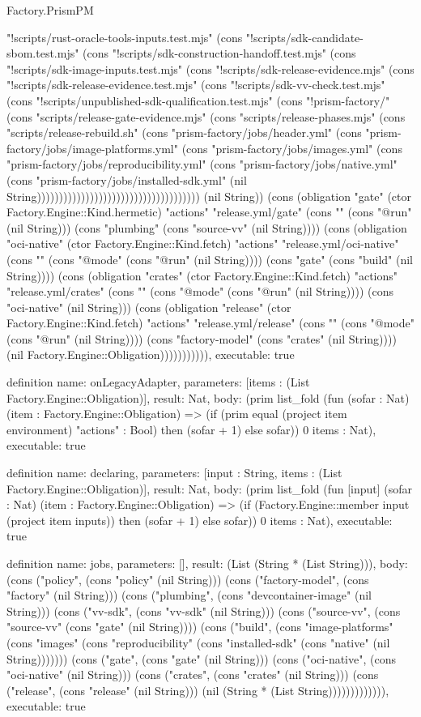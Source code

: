 \begin{lexlean}{Factory.PrismPM}
\begin{semanticmodule}
{"!scripts/rust-oracle-tools-inputs.test.mjs" (cons "!scripts/sdk-candidate-sbom.test.mjs" (cons "!scripts/sdk-construction-handoff.test.mjs" (cons "!scripts/sdk-image-inputs.test.mjs" (cons "!scripts/sdk-release-evidence.mjs" (cons "!scripts/sdk-release-evidence.test.mjs" (cons "!scripts/sdk-vv-check.test.mjs" (cons "!scripts/unpublished-sdk-qualification.test.mjs" (cons "!prism-factory/" (cons "scripts/release-gate-evidence.mjs" (cons "scripts/release-phases.mjs" (cons "scripts/release-rebuild.sh" (cons "prism-factory/jobs/header.yml" (cons "prism-factory/jobs/image-platforms.yml" (cons "prism-factory/jobs/images.yml" (cons "prism-factory/jobs/reproducibility.yml" (cons "prism-factory/jobs/native.yml" (cons "prism-factory/jobs/installed-sdk.yml" (nil String))))))))))))))))))))))))))))))))))))) (nil String)) (cons (obligation "gate" (ctor Factory.Engine::Kind.hermetic) "actions" "release.yml/gate" (cons "" (cons "@run" (nil String))) (cons "plumbing" (cons "source-vv" (nil String)))) (cons (obligation "oci-native" (ctor Factory.Engine::Kind.fetch) "actions" "release.yml/oci-native" (cons "" (cons "@mode" (cons "@run" (nil String)))) (cons "gate" (cons "build" (nil String)))) (cons (obligation "crates" (ctor Factory.Engine::Kind.fetch) "actions" "release.yml/crates" (cons "" (cons "@mode" (cons "@run" (nil String)))) (cons "oci-native" (nil String))) (cons (obligation "release" (ctor Factory.Engine::Kind.fetch) "actions" "release.yml/release" (cons "" (cons "@mode" (cons "@run" (nil String)))) (cons "factory-model" (cons "crates" (nil String)))) (nil Factory.Engine::Obligation))))))))))),
  executable: true
}

definition{
  name: onLegacyAdapter,
  parameters: [items : (List Factory.Engine::Obligation)],
  result: Nat,
  body: (prim list_fold (fun (sofar : Nat) (item : Factory.Engine::Obligation) => (if (prim equal (project item environment) "actions" : Bool) then (sofar + 1) else sofar)) 0 items : Nat),
  executable: true
}

definition{
  name: declaring,
  parameters: [input : String, items : (List Factory.Engine::Obligation)],
  result: Nat,
  body: (prim list_fold (fun [input] (sofar : Nat) (item : Factory.Engine::Obligation) => (if (Factory.Engine::member input (project item inputs)) then (sofar + 1) else sofar)) 0 items : Nat),
  executable: true
}

definition{
  name: jobs,
  parameters: [],
  result: (List (String * (List String))),
  body: (cons ("policy", (cons "policy" (nil String))) (cons ("factory-model", (cons "factory" (nil String))) (cons ("plumbing", (cons "devcontainer-image" (nil String))) (cons ("vv-sdk", (cons "vv-sdk" (nil String))) (cons ("source-vv", (cons "source-vv" (cons "gate" (nil String)))) (cons ("build", (cons "image-platforms" (cons "images" (cons "reproducibility" (cons "installed-sdk" (cons "native" (nil String))))))) (cons ("gate", (cons "gate" (nil String))) (cons ("oci-native", (cons "oci-native" (nil String))) (cons ("crates", (cons "crates" (nil String))) (cons ("release", (cons "release" (nil String))) (nil (String * (List String))))))))))))),
  executable: true
}


\end{semanticmodule}
\end{lexlean}
